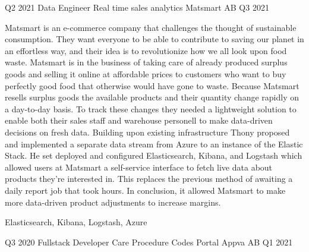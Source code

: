 \begin{experiences}
    \experience
    {Q2 2021}   
    {Data Engineer}
    {Real time sales analytics}
    {Matsmart AB}
    {Q3 2021} {

        Matsmart is an e-commerce company that challenges the thought of sustainable consumption.
        They want everyone to be able to contribute to saving our planet in an effortless way, and their idea is to revolutionize how we all look upon food waste. Matsmart is in the business of taking care of already produced surplus goods and selling it online at affordable prices to customers who want to buy perfectly good food that otherwise would have gone to waste.
        \newline \newline
        Because Matsmart resells surplus goods the available products and their quantity change rapidly on a day-to-day basis.
        To track these changes they needed a lightweight solution to enable both their sales staff and warehouse personell to make data-driven decisions on fresh data.
        \newline \newline
        Building upon existing infrastructure Thony proposed and implemented a separate data stream from Azure to an instance of the Elastic Stack.
        He set deployed and configured Elasticsearch, Kibana, and Logstash which allowed users at Matsmart a self-service interface to fetch live data about products they're interested in.
        This replaces the previous method of awaiting a daily report job that took hours.
        In conclusion, it allowed Matsmart to make more data-driven product adjustments to increase margins.
        \newline
    }
    {Elasticsearch, Kibana, Logstash, Azure}
    \emptySeparator
    
    \experience
    {Q3 2020}   
    {Fullstack Developer}
    {Care Procedure Codes Portal}
    {Appva AB}
    {Q1 2021} {
    
}
\end{experiences}
